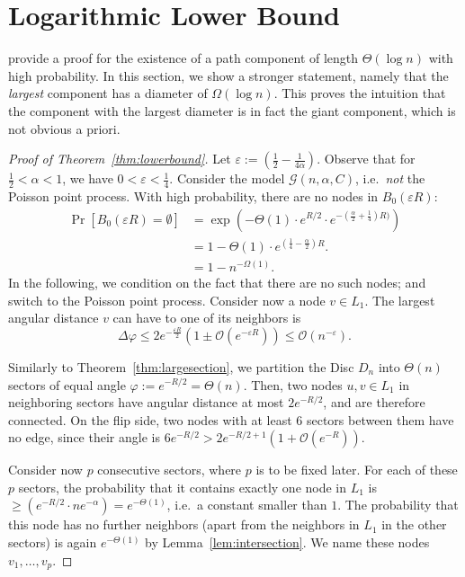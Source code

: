 \documentclass{llncs}
\newcommand{\Oh}{\mathcal{O}}
\def\Pr{\operatorname{Pr}}
\newcommand{\thmref}[1]{Theorem~\ref{thm:#1}}
\newcommand{\lemref}[1]{Lemma~\ref{lem:#1}}
\newcommand{\eps}{\ensuremath{\varepsilon}}
\renewcommand{\leq}{\leqslant}
\renewcommand{\geq}{\geqslant}
\begin{document}
\section{Logarithmic Lower Bound}
\label{sec:lower}

\citet{KiwiMitsche15} provide a proof for the existence of a path component of length $\Theta(\log n)$ with high probability. In this section, we show a stronger statement, namely that the {\em largest} component has a diameter of $\Omega(\log n)$. This proves the intuition that the component with the largest diameter is in fact the giant component, which is not obvious a priori. 

\begin{proof}[Proof of \thmref{lowerbound}]
Let $\eps := (\frac12-\frac1{4\alpha})$. Observe that for $\tfrac12 < \alpha <1$, we have $0 < \eps < \tfrac14$. Consider the model $\mathcal G(n,\alpha, C)$, i.e.\ {\em not} the Poisson point process. With high probability, there are no nodes in $B_0(\eps R)$:
\begin{align*}
\Pr[B_0(\eps R) = \emptyset]  &= \exp(-\Theta(1) \cdot e^{R/2} \cdot e^{-(\frac \alpha2 + \frac14)R)} ) \\
&= 1 - \Theta(1) \cdot e^{(\frac14 - \frac\alpha2)R}.\\
&= 1 - n^{-\Omega(1)}.
\end{align*}
In the following, we condition on the fact that there are no such nodes; and switch to the Poisson point process. Consider now a node $v \in L_1$. The largest angular distance $v$ can have to one of its neighbors is
\begin{equation}
\Delta\varphi \leq 2e^{-\frac{\eps R}2} (1 \pm \Oh(e^{-\eps R})) \leq \Oh(n^{-\eps}). \label{eq:uncoveredangle}
\end{equation}

Similarly to \thmref{largesection}, we partition the Disc $D_n$ into $\Theta(n)$ sectors of equal angle $\varphi := e^{-R/2} = \Theta(n)$. Then, two nodes $u,v\in L_1$ in neighboring sectors have angular distance at most  $2e^{-R/2} $, and are therefore connected. On the flip side, two nodes with at least $6$ sectors between them have no edge, since their angle is $6e^{-R/2} > 2e^{-R/2 +1} (1 + \Oh(e^{-R}))$.

Consider now $p$ consecutive sectors, where $p$ is to be fixed later. For each of these $p$ sectors, the probability that it contains exactly one node in $L_1$ is 
$\geq (e^{-R/2} \cdot n e^{-\alpha} ) = e^{-\Theta(1)}$, i.e.\ a constant smaller than $1$. The probability that this node has no further neighbors (apart from the neighbors in $L_1$ in the other sectors) is again $e^{-\Theta(1)}$ by \lemref{intersection}. We name these nodes $v_1, \ldots, v_p$.


\end{proof}
\end{document}

